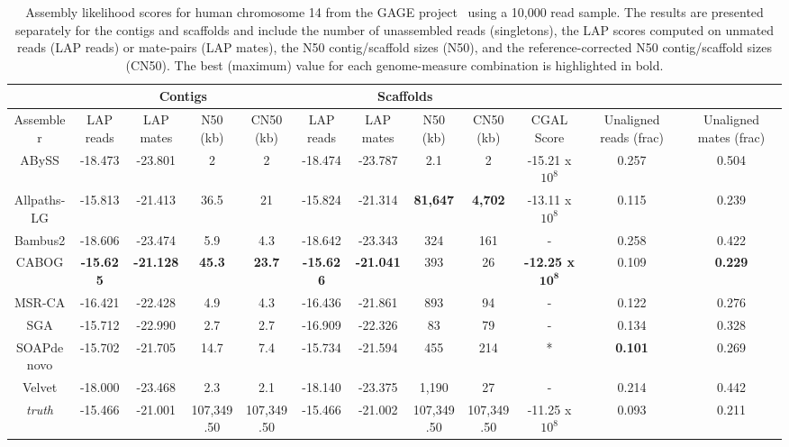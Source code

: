\documentclass[12pt,\mydriver]{thesis}
\begin{document}
\begin{landscape}
\renewcommand{\baselinestretch}{1}
\small\normalsize
\begin{table}[tb!]
\centering
\tiny
\begin{tabular}{|c|c|c|c|c|c|c|c|c|c|c|c|}
\hline
 & \multicolumn{4}{c|}{Contigs} & \multicolumn{4}{c|}{Scaffolds} & & & \\
\hline
Assembler & LAP reads & LAP mates & N50 (kb) & CN50 (kb) & LAP reads & LAP mates & N50 (kb) & CN50 (kb) & CGAL Score & Unaligned reads (frac) & Unaligned mates (frac)\\
\hline
ABySS & -18.473 & -23.801 & 2 & 2 & -18.474 & -23.787 & 2.1 & 2 & -15.21 x $10^8$ &0.257 & 0.504\\
Allpaths-LG & -15.813 & -21.413 & 36.5 & 21 & -15.824 & -21.314 & {\bf 81,647} & {\bf 4,702} & -13.11 x $10^8$ &0.115 & 0.239\\
Bambus2 & -18.606 & -23.474 & 5.9 & 4.3 & -18.642 & -23.343 & 324 & 161 & - & 0.258 & 0.422\\
CABOG & {\bf -15.625} & {\bf -21.128} & {\bf 45.3} & {\bf 23.7} & {\bf -15.626} & {\bf -21.041} & 393 & 26 & {\bf -12.25 x} $\mathbf{10^8}$ & 0.109 & {\bf 0.229}\\
MSR-CA & -16.421 & -22.428 & 4.9 & 4.3 & -16.436 & -21.861 & 893 & 94 & - & 0.122 & 0.276\\
SGA & -15.712 & -22.990 & 2.7 & 2.7 & -16.909 & -22.326 & 83 & 79 & - & 0.134 & 0.328\\
SOAPdenovo & -15.702 & -21.705 & 14.7 & 7.4 & -15.734 & -21.594 & 455 & 214 & * & {\bf 0.101} & 0.269 \\
Velvet & -18.000 & -23.468 & 2.3 & 2.1 & -18.140 & -23.375 & 1,190 & 27 & - & 0.214 & 0.442\\
\emph{truth} & -15.466 & -21.001 & 107,349.50 & 107,349.50 & -15.466 & -21.002 & 107,349.50 & 107,349.50 & -11.25 x $10^8$ & 0.093 & 0.211 \\
\hline
\end{tabular}
\caption[\emph{Homo sapiens} chr 14 assembly evaluation]{Assembly likelihood scores for human chromosome 14 from the GAGE project~\cite{earl2011assemblathon} using a 10,000 read sample.
The results are presented
separately for the contigs and scaffolds and include the number of
unassembled reads (singletons), the LAP scores computed on unmated reads (LAP reads) or
mate-pairs (LAP mates), the N50 contig/scaffold sizes (N50),
and the reference-corrected N50 contig/scaffold sizes (CN50).
The best (maximum) value for each
genome-measure combination is highlighted in bold.
}
\end{table}
\end{landscape}
\end{document}
